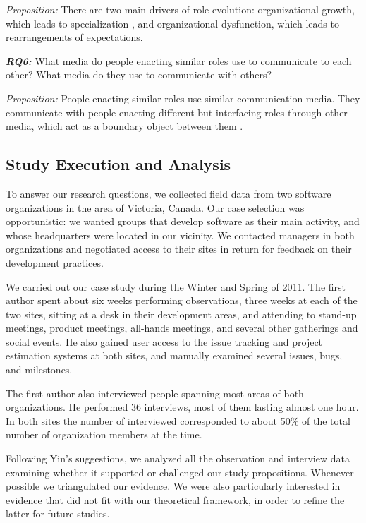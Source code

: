 \documentclass[10pt, conference, compsocconf]{IEEEtran}
\begin{document}
\emph{Proposition:} There are two main drivers of role evolution: organizational growth, which leads to specialization \cite{Blau1971,Haveman1993}, and organizational dysfunction, which leads to rearrangements of expectations.

\textbf{\emph{RQ6:}} What media do people enacting similar roles use to communicate to each other? What media do they use to communicate with others?

\emph{Proposition:} People enacting similar roles use similar communication media. They communicate with people enacting different but interfacing roles through other media, which act as a boundary object between them \cite{Bowker1999}.



\subsection{Study Execution and Analysis}

To answer our research questions, we collected field data from two software organizations in the area of Victoria, Canada. Our case selection was opportunistic: we wanted groups that develop software as their main activity, and whose headquarters were located in our vicinity. We contacted managers in both organizations and negotiated access to their sites in return for feedback on their development practices.

We carried out our case study during the Winter and Spring of 2011. The first author spent about six weeks performing observations, three weeks at each of the two sites, sitting at a desk in their development areas, and attending to stand-up meetings, product meetings, all-hands meetings, and several other gatherings and social events. He also gained user access to the issue tracking and project estimation systems at both sites, and manually examined several issues, bugs, and milestones.

The first author also interviewed people spanning most areas of both organizations. He performed 36 interviews, most of them lasting almost one hour. In both sites the number of interviewed corresponded to about 50\% of the total number of organization members at the time.

Following Yin's \cite{Yin2003} suggestions, we analyzed all the observation and interview data examining whether it supported or challenged our study propositions. Whenever possible we triangulated our evidence. We were also particularly interested in evidence that did not fit with our theoretical framework, in order to refine the latter for future studies.
\end{document}
